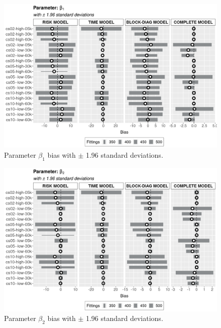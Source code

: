 \documentclass[a4paper,12pt]{article}
\begin{document}
\vspace{-0.39cm}
\begin{figure}[H]
 \centering
 \includegraphics[width=\linewidth]{../../THESIS/thesis/figures/bias2plotsd-1.png}
 \vspace{-0.75cm}
 \caption{Parameter \(\beta_{1}\) bias with \(\pm\) 1.96 standard
   deviations.}
 \label{fig:biassdbeta1}
\end{figure}

\begin{figure}[H]
 \centering
 \includegraphics[width=\linewidth]{../../THESIS/thesis/figures/bias2plotsd-2.png}
 \vspace{-0.75cm}
 \caption{Parameter \(\beta_{2}\) bias with \(\pm\) 1.96 standard
   deviations.}
 \label{fig:biassdbeta2}
\end{figure}
\end{document}

